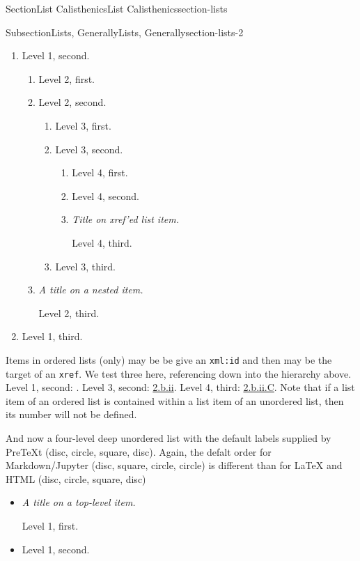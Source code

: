 \documentclass[twoside,10pt,]{article}
\newcommand{\xreffont}{\relax}
\newcommand{\mono}[1]{\texttt{#1}}
\newcommand{\lititle}[1]{{\slshape#1}}
\numberwithin{equation}{section}
\begin{document}
\begin{sectionptx}{Section}{List Calisthenics}{}{List Calisthenics}{}{}{section-lists}
\begin{subsectionptx}{Subsection}{Lists, Generally}{}{Lists, Generally}{}{}{section-lists-2}
\begin{enumerate}
Level 1, first.%
\item\hypertarget{list-two}{}Level 1, second.%
\begin{enumerate}
\item{}Level 2, first.%
\item{}Level 2, second.%
\begin{enumerate}
\item{}Level 3, first.%
\item\hypertarget{list-two-two-two}{}Level 3, second.%
\begin{enumerate}
\item{}Level 4, first.%
\item{}Level 4, second.%
\item\hypertarget{list-two-two-two-three}{}\lititle{Title on xref'ed list item.}\par%
Level 4, third.%
\end{enumerate}
%
\item{}Level 3, third.%
\end{enumerate}
%
\item{}\lititle{A title on a nested item.}\par%
Level 2, third.%
\end{enumerate}
%
\item{}Level 1, third.%
\end{enumerate}
%
\par
Items in ordered lists (only) may be be give an \mono{xml:id} and then may be the target of an \mono{xref}.  We test three here, referencing down into the hierarchy above.  Level 1, second: \hyperlink{list-two}{{\xreffont 2}}.  Level 3, second: \hyperlink{list-two-two-two}{{\xreffont 2.b.ii}}.  Level 4, third: \hyperlink{list-two-two-two-three}{{\xreffont 2.b.ii.C}}.  Note that if a list item of an ordered list is contained within a list item of an unordered list, then its number will not be defined.%
\par
And now a four-level deep unordered list with the default labels supplied by PreTeXt (disc, circle, square, disc).  Again, the defalt order for Markdown\slash{}Jupyter (disc, square, circle, circle) is different than for \LaTeX{} and HTML (disc, circle, square, disc)%
\begin{itemize}[label=\textbullet]
\item{}\lititle{A title on a top-level item.}\par%
Level 1, first.%
\item{}Level 1, second.%
\begin{itemize}[label=$\circ$]

\end{itemize}
\end{itemize}
\end{subsectionptx}
\end{sectionptx}
\end{document}
